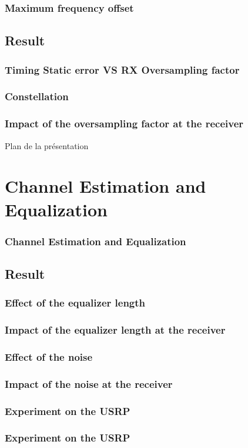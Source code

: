 \documentclass[11pt]{beamer}
\begin{document}
\begin{frame}
\frametitle{Maximum frequency offset}


\end{frame}

\subsection{Result}
\subsubsection{}
\begin{frame}
\frametitle{Timing Static error VS RX Oversampling factor}

\end{frame}

\subsubsection{Constellation}

\begin{frame}
\frametitle{Impact of the oversampling factor at the receiver}


\end{frame}

{
	\begin{frame}[noframenumbering]{Plan de la présentation}
		\tableofcontents
	\end{frame}
}

\section{Channel Estimation and Equalization}
\begin{frame}
\frametitle{Channel Estimation and Equalization}

\end{frame}

\begin{frame}


\end{frame}
\subsection{Result}
\subsubsection{Effect of the equalizer length}
\begin{frame}
\frametitle{Impact of the equalizer length at the receiver}


\end{frame}
\subsubsection{Effect of the noise}
\begin{frame}
\frametitle{Impact of the noise at the receiver}

\end{frame}
\subsubsection{Experiment on the USRP}
\begin{frame}
\frametitle{Experiment on the USRP}

\end{frame}
\end{document}
